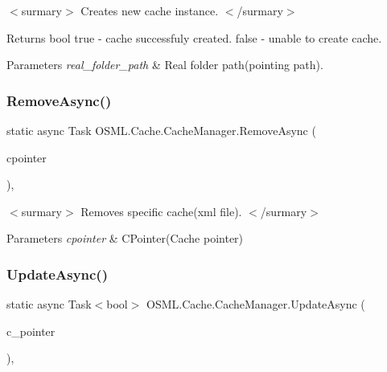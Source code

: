 $<$surmary$>$ Creates new cache instance. $<$/surmary$>$ \begin{DoxyReturn}{Returns}
bool true -\/ cache successfuly created. false -\/ unable to create cache. 
\end{DoxyReturn}

\begin{DoxyParams}{Parameters}
{\em real\+\_\+folder\+\_\+path} & Real folder path(pointing path). \\
\hline
\end{DoxyParams}
\mbox{\label{classOSML_1_1Cache_1_1CacheManager_a958c9e18525ae24dc5dd3c3a34a201f6}} 
\subsubsection{\texorpdfstring{RemoveAsync()}{RemoveAsync()}}
{\footnotesize\ttfamily static async Task O\+S\+M\+L.\+Cache.\+Cache\+Manager.\+Remove\+Async (\begin{DoxyParamCaption}\item[{\mbox{\hyperlink{classOSML_1_1Cache_1_1CPointer}{C\+Pointer}}}]{cpointer }\end{DoxyParamCaption})\hspace{0.3cm}{\ttfamily [inline]}, {\ttfamily [static]}}

$<$surmary$>$ Removes specific cache(xml file). $<$/surmary$>$ 
\begin{DoxyParams}{Parameters}
{\em cpointer} & C\+Pointer(\+Cache pointer)\\
\hline
\end{DoxyParams}
\mbox{\label{classOSML_1_1Cache_1_1CacheManager_aeb65d11786064f146f115d0f642e96ab}} 
\subsubsection{\texorpdfstring{UpdateAsync()}{UpdateAsync()}}
{\footnotesize\ttfamily static async Task$<$bool$>$ O\+S\+M\+L.\+Cache.\+Cache\+Manager.\+Update\+Async (\begin{DoxyParamCaption}\item[{\mbox{\hyperlink{classOSML_1_1Cache_1_1CPointer}{C\+Pointer}}}]{c\+\_\+pointer }\end{DoxyParamCaption})\hspace{0.3cm}{\ttfamily [inline]}, {\ttfamily [static]}}

